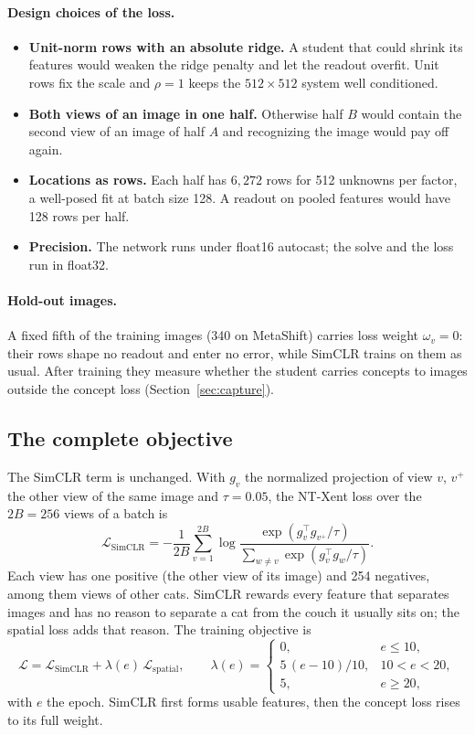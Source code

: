 \documentclass{article}
\begin{document}
\paragraph{Design choices of the loss.}
\begin{itemize}
\item \textbf{Unit-norm rows with an absolute ridge.} A student that could shrink its features would weaken the ridge penalty and let the readout overfit. Unit rows fix the scale and $\rho=1$ keeps the $512\times512$ system well conditioned.
\item \textbf{Both views of an image in one half.} Otherwise half $B$ would contain the second view of an image of half $A$ and recognizing the image would pay off again.
\item \textbf{Locations as rows.} Each half has $6{,}272$ rows for 512 unknowns per factor, a well-posed fit at batch size 128. A readout on pooled features would have 128 rows per half.
\item \textbf{Precision.} The network runs under float16 autocast; the solve and the loss run in float32.
\end{itemize}

\paragraph{Hold-out images.}
A fixed fifth of the training images (340 on MetaShift) carries loss weight $\omega_v=0$: their rows shape no readout and enter no error, while SimCLR trains on them as usual. After training they measure whether the student carries concepts to images outside the concept loss (Section~\ref{sec:capture}).

\subsection{The complete objective}
The SimCLR term is unchanged. With $g_v$ the normalized projection of view $v$, $v^+$ the other view of the same image and $\tau=0.05$, the NT-Xent loss \citep{oord2018cpc,chen2020simclr} over the $2B=256$ views of a batch is
\begin{equation}
 \mathcal{L}_{\mathrm{SimCLR}}=-\frac{1}{2B}\sum_{v=1}^{2B}\log\frac{\exp(g_v^\top g_{v^+}/\tau)}{\sum_{w\neq v}\exp(g_v^\top g_w/\tau)}.
\end{equation}
Each view has one positive (the other view of its image) and 254 negatives, among them views of other cats. SimCLR rewards every feature that separates images and has no reason to separate a cat from the couch it usually sits on; the spatial loss adds that reason. The training objective is
\begin{equation}
 \mathcal{L}=\mathcal{L}_{\mathrm{SimCLR}}+\lambda(e)\,\mathcal{L}_{\mathrm{spatial}},\qquad
 \lambda(e)=\begin{cases}0,& e\le10,\\ 5\,(e-10)/10,& 10<e<20,\\ 5,& e\ge20,\end{cases}
\end{equation}
with $e$ the epoch. SimCLR first forms usable features, then the concept loss rises to its full weight.
\end{document}
